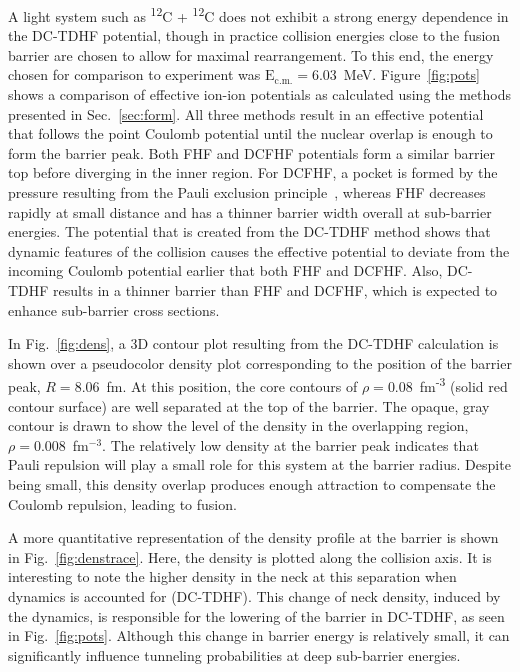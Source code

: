 A light system such as \textsuperscript{12}C + \textsuperscript{12}C does not exhibit a strong energy dependence in the DC-TDHF potential, though in practice collision energies close to the fusion barrier are chosen to allow for maximal rearrangement.
To this end, the energy chosen for comparison to experiment was $\mathrm{E_{c.m.}}=6.03$~MeV.
Figure~\ref{fig:pots} shows a comparison of effective ion-ion potentials as calculated using the methods presented in Sec.~\ref{sec:form}.
All three methods result in an effective potential that follows the point Coulomb potential until the nuclear overlap is enough to form the barrier peak.
Both FHF and DCFHF potentials form a similar barrier top before diverging in the inner region.
For DCFHF, a pocket is formed by the pressure resulting from the Pauli exclusion principle~\protect\citep{simenel2017}, whereas FHF decreases rapidly at small distance and has a thinner barrier width overall at sub-barrier energies.
The potential that is created from the DC-TDHF method shows that dynamic features of the collision causes the effective potential to deviate from the incoming Coulomb potential earlier that both FHF and DCFHF.
Also, DC-TDHF results in a thinner barrier than FHF and DCFHF, which is expected to enhance sub-barrier cross sections.

In Fig.~\ref{fig:dens}, a 3D contour plot resulting from the DC-TDHF calculation is shown over a pseudocolor density plot corresponding to the position of the barrier peak, $R=8.06$~fm. 
At this position, the core contours of $\rho = 0.08$~fm\textsuperscript{-3} (solid red contour surface) are well separated at the top of the barrier. 
The opaque, gray contour is drawn to show the level of the density in the overlapping region, $\rho = 0.008$~fm$^{-3}$.
The relatively low density at the barrier peak indicates that Pauli repulsion will play a small role for this system at the barrier radius.
Despite being small, this density overlap produces enough attraction to compensate the Coulomb repulsion, leading to fusion.

A more quantitative representation of the density profile at the barrier is shown in Fig.~\ref{fig:denstrace}.
Here, the density is plotted along the collision axis. 
It is interesting to note the higher density in the neck at this separation when dynamics is accounted for (DC-TDHF).
This change of neck density, induced by the dynamics, is responsible for the lowering of the barrier in DC-TDHF, as seen in Fig.~\ref{fig:pots}.
Although this change in barrier energy is relatively small, it can significantly influence tunneling probabilities at deep sub-barrier energies. 


